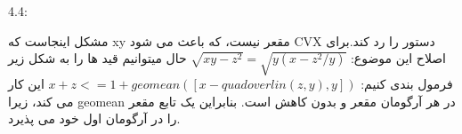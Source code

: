 4.4:

مشکل اینجاست که xy مقعر نیست، که باعث می شود CVX دستور را رد کند.برای اصلاح این موضوع:
$ \sqrt{xy - z^2} = \sqrt{y(x-z^2/y)} $
حال میتوانیم قید ها را به شکل زیر فرمول بندی کنیم:
$ x + z <= 1 + geomean([x - quadoverlin(z,y), y]) $
این کار می کند، زیرا geomean در هر آرگومان مقعر و بدون کاهش است. بنابراین یک تابع مقعر را در آرگومان اول خود می پذیرد.



\begin{center}
\end{center}

